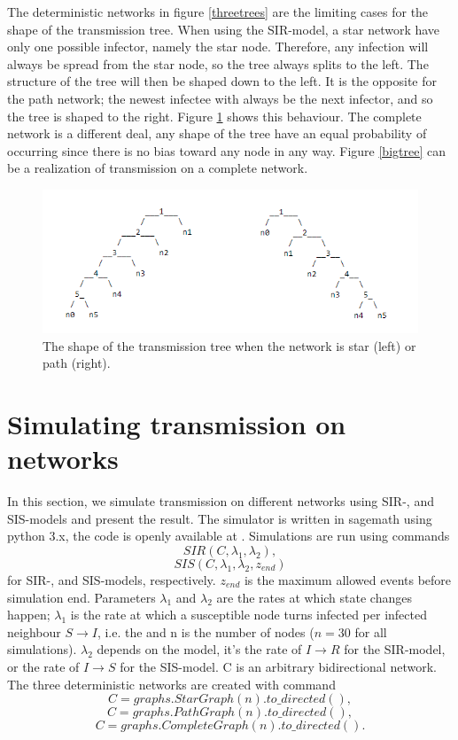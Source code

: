 \documentclass[12pt]{article} %
\numberwithin{equation}{section}
\begin{document}
The deterministic networks in figure \ref{threetrees} are the limiting cases for the shape of the transmission tree. When using the SIR-model, a star network have only one possible infector, namely the star node. Therefore, any infection will always be spread from the star node, so the tree always splits to the left. The structure of the tree will then be shaped down to the left. It is the opposite for the path network; the newest infectee with always be the next infector, and so the tree is shaped to the right. Figure \ref{pathstartree} shows this behaviour. The complete network is a different deal, any shape of the tree have an equal probability of occurring since there is no bias toward any node in any way. Figure \ref{bigtree} can be a realization of transmission on a complete network.
\begin{figure}
    \centering
    \includegraphics[scale=0.7]{starpathtree.png}   
    \caption{The shape of the transmission tree when the network is star (left) or path (right).}
    \label{pathstartree}
\end{figure}
\FloatBarrier


\section{Simulating transmission on networks}\label{simulation-section}
In this section, we simulate transmission on different networks using SIR-, and SIS-models and present the result. The simulator is written in sagemath using python 3.x, the code is openly available at \cite{github}. Simulations are run using commands $$SIR(C,\lambda_1,\lambda_2),$$ $$SIS(C,\lambda_1,\lambda_2,z_{end})$$
for SIR-, and SIS-models, respectively. $z_{end}$ is the maximum allowed events before simulation end. Parameters $\lambda_{1}$ and $\lambda_{2}$ are the rates at which state changes happen; $\lambda_1$ is the rate at which a susceptible node turns infected per infected neighbour $S\rightarrow I$, i.e. the and n is the number of nodes ($n=30$ for all simulations). $\lambda_2$ depends on the model, it's the rate of $I\rightarrow R$ for the SIR-model, or the rate of $I\rightarrow S$ for the SIS-model. C is an arbitrary bidirectional network. The three deterministic networks are created with command $$C = graphs.StarGraph(n).to\_directed(),$$ $$C = graphs.PathGraph(n).to\_directed(),$$ $$C = graphs.CompleteGraph(n).to\_directed().$$
\end{document}
